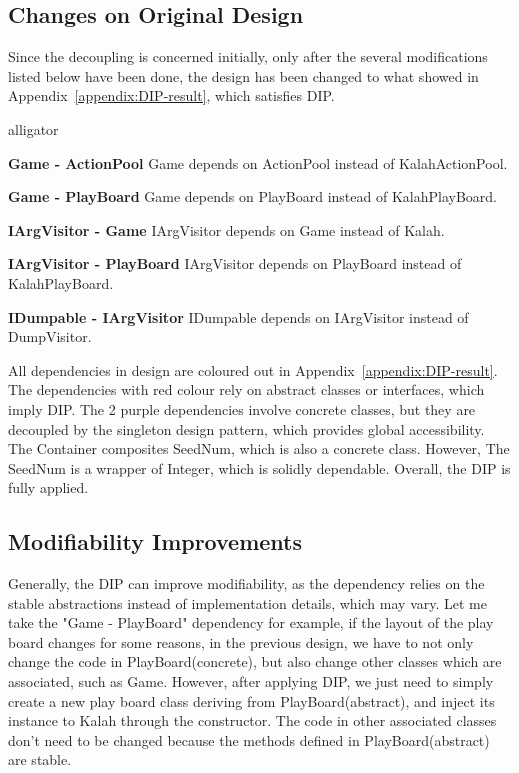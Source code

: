 \documentclass[conference]{IEEEtran}
\begin{document}
\subsection{Changes on Original Design}
Since the decoupling is concerned initially, only after the several modifications listed below have been done, the design has been changed to what showed in Appendix~\ref{appendix:DIP-result}, which satisfies \gls{DIP}.

\begin{labeling}{alligator}
	\item [\textbf{Game - ActionPool}] {Game depends on ActionPool instead of KalahActionPool.}
	\item [\textbf{Game - PlayBoard}] {Game depends on PlayBoard instead of KalahPlayBoard.}
	\item [\textbf{IArgVisitor - Game}] {IArgVisitor depends on Game instead of Kalah.}
	\item [\textbf{IArgVisitor - PlayBoard}] {IArgVisitor depends on PlayBoard instead of KalahPlayBoard.}
	\item [\textbf{IDumpable - IArgVisitor}] {IDumpable depends on IArgVisitor instead of DumpVisitor.}
\end{labeling}

All dependencies in design are coloured out in Appendix~\ref{appendix:DIP-result}. The dependencies with red colour rely on abstract classes or interfaces, which imply \gls{DIP}. The 2 purple dependencies involve concrete classes, but they are decoupled by the singleton design pattern, which provides global accessibility. The Container composites SeedNum, which is also a concrete class. However, The SeedNum is a wrapper of Integer, which is solidly dependable. Overall, the \gls{DIP} is fully applied.

\subsection{Modifiability Improvements}

Generally, the \gls{DIP} can improve modifiability, as the dependency relies on the stable abstractions instead of implementation details, which may vary. Let me take the "Game - PlayBoard" dependency for example, if the layout of the play board changes for some reasons, in the previous design, we have to not only change the code in PlayBoard(concrete), but also change other classes which are associated, such as Game. However, after applying \gls{DIP}, we just need to simply create a new play board class deriving from PlayBoard(abstract), and inject its instance to Kalah through the constructor. The code in other associated classes don't need to be changed because the methods defined in PlayBoard(abstract) are stable.
\end{document}
